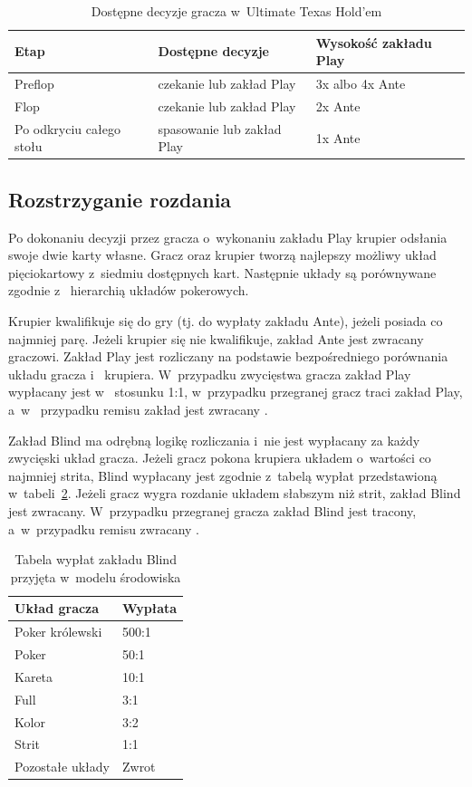 \begin{table}[h]
\centering
\caption{Dostępne decyzje gracza w~Ultimate Texas Hold’em}
\label{tab:uth_decisions}
\begin{tabular}{lll}
\toprule
Etap & Dostępne decyzje & Wysokość zakładu Play \\
\midrule
Preflop & czekanie lub zakład Play & 3x albo 4x Ante \\
Flop & czekanie lub zakład Play & 2x Ante \\
Po odkryciu całego stołu & spasowanie lub zakład Play & 1x Ante \\
\bottomrule
\end{tabular}
\end{table}

\subsection{Rozstrzyganie rozdania}

Po dokonaniu decyzji przez gracza o~wykonaniu zakładu Play krupier odsłania
swoje dwie karty własne. Gracz oraz krupier tworzą najlepszy
możliwy układ pięciokartowy z~siedmiu dostępnych kart. Następnie układy są porównywane zgodnie z~
hierarchią układów pokerowych.

Krupier kwalifikuje się do gry (tj. do wypłaty zakładu Ante), jeżeli posiada co najmniej parę. Jeżeli
krupier się nie kwalifikuje, zakład Ante jest zwracany graczowi. Zakład Play
jest rozliczany na podstawie bezpośredniego porównania układu gracza i~
krupiera. W~przypadku zwycięstwa gracza zakład Play wypłacany jest w~
stosunku 1:1, w~przypadku przegranej gracz traci zakład Play, a~w~
przypadku remisu zakład jest zwracany \cite{tulalip_uth_rules,wizard_uth}.

Zakład Blind ma odrębną logikę rozliczania i~nie jest wypłacany za każdy
zwycięski układ gracza. Jeżeli gracz pokona krupiera układem o~wartości co
najmniej strita, Blind wypłacany jest zgodnie z~tabelą wypłat przedstawioną
w~tabeli~\ref{tab:blind_payouts}. Jeżeli gracz wygra rozdanie układem
słabszym niż strit, zakład Blind jest zwracany. W~przypadku przegranej
gracza zakład Blind jest tracony, a~w~przypadku remisu zwracany
\cite{tulalip_uth_rules}.

\begin{table}[h]
\centering
\caption{Tabela wypłat zakładu Blind przyjęta w~modelu środowiska}
\label{tab:blind_payouts}
\begin{tabular}{ll}
\toprule
Układ gracza & Wypłata \\
\midrule
Poker królewski & 500:1 \\
Poker & 50:1 \\
Kareta & 10:1 \\
Full & 3:1 \\
Kolor & 3:2 \\
Strit & 1:1 \\
Pozostałe układy & Zwrot \\
\bottomrule
\end{tabular}
\end{table}

